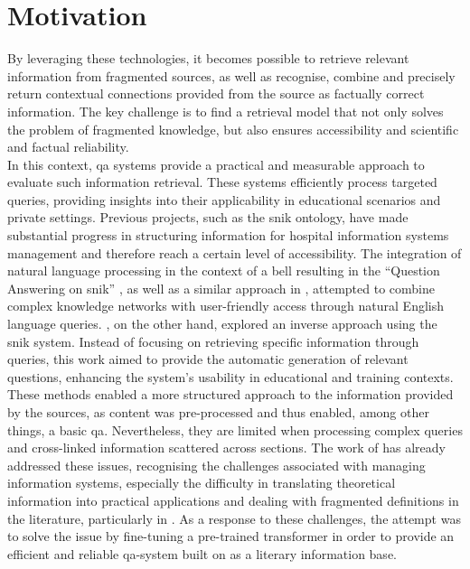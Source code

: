\section{Motivation}\label{sec:motivation}
By leveraging these technologies, it becomes possible to retrieve relevant information from fragmented sources, as well as recognise, combine and precisely return contextual connections provided from the source as factually correct information. 
The key challenge is to find a retrieval model that not only solves the problem of fragmented knowledge, but also ensures accessibility and scientific and factual reliability.\\ 
In this context, \ac{qa} systems provide a practical and measurable approach to evaluate such information retrieval. 
These systems efficiently process targeted queries, providing insights into their applicability in educational scenarios and private settings.
% 
Previous projects, such as the \ac{snik} ontology, have made substantial progress in structuring information for hospital information systems management and therefore reach a certain level of accessibility. 
The integration of natural language processing in the context of a \ac{bell} resulting in the \enquote{Question Answering on \ac{snik}} \citep{hannesbell, hannesbell_skill}, as well as a similar approach in \citet{snikquiz}, attempted to combine complex knowledge networks with user-friendly access through natural English language queries. \citet{arneba}, on the other hand, explored an inverse approach using the \ac{snik} system. 
Instead of focusing on retrieving specific information through queries, this work aimed to provide the automatic generation of relevant questions, enhancing the system's usability in educational and training contexts.\\
%
These methods enabled a more structured approach to the information provided by the sources, as content was pre-processed and thus enabled, among other things, a basic \ac{qa}.
Nevertheless, they are limited when processing complex queries and cross-linked information scattered across sections.
The work of \citet{Paul_Keller} has already addressed these issues, recognising the challenges associated with managing information systems, especially the difficulty in translating theoretical information into practical applications and dealing with fragmented definitions in the literature, particularly in \citet{bb2}.
As a response to these challenges, the attempt was to solve the issue by fine-tuning a pre-trained transformer in order to provide an efficient and reliable \ac{qa}-system built on \citet{bb2} as a literary information base.
